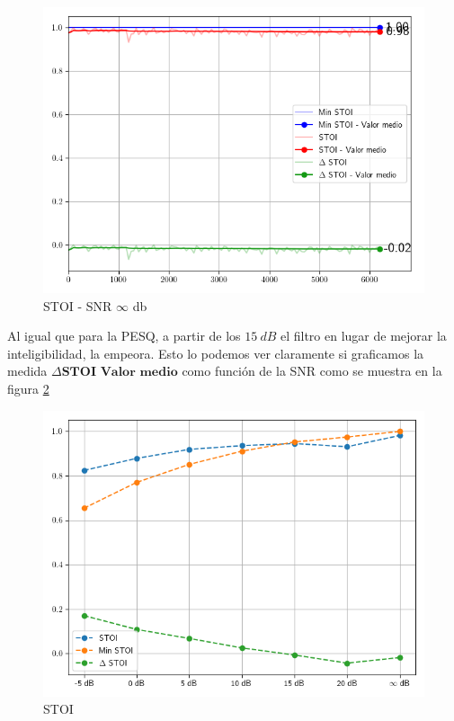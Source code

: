 \begin{figure}[H]
	\centering
	\centerline{\includegraphics[scale=0.75]{images/ch6/af/objective_metrics/metric_STOI_infdb.png}}
	\caption{STOI - SNR $\infty$ db}
	\label{fig:ch6_stoi_inf_db}
\end{figure}

Al igual que para la PESQ, a partir de los $\SI{15}{dB}$ el filtro en lugar de mejorar la inteligibilidad, la empeora. Esto lo podemos ver claramente si graficamos la medida $\Delta \textbf{STOI Valor medio}$ como función de la SNR como se muestra en la figura \ref{fig:ch6_stoi_resume}

\begin{figure}
	\centering
	\centerline{\includegraphics[scale=0.75]{images/ch6/af/objective_metrics/metric_STOI.png}}
	\caption{STOI}
	\label{fig:ch6_stoi_resume}
\end{figure}

